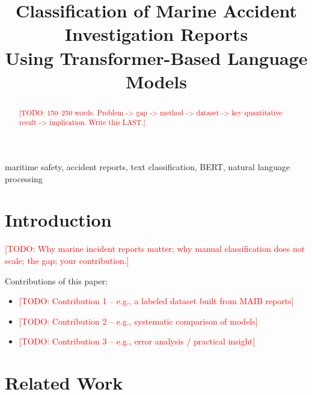 \documentclass[conference]{IEEEtran}
\newcommand{\todo}[1]{\textcolor{red}{[TODO: #1]}}
\begin{document}
\title{Classification of Marine Accident Investigation Reports\\
Using Transformer-Based Language Models}

\author{
\and
{}
}

\maketitle

\begin{abstract}
\todo{150--250 words. Problem -> gap -> method -> dataset -> key quantitative result -> implication. Write this LAST.}
\end{abstract}

\begin{IEEEkeywords}
maritime safety, accident reports, text classification, BERT, natural language processing
\end{IEEEkeywords}

\section{Introduction}
\todo{Why marine incident reports matter; why manual classification does not scale; the gap; your contribution.}

Contributions of this paper:
\begin{itemize}
  \item \todo{Contribution 1 -- e.g., a labeled dataset built from MAIB reports}
  \item \todo{Contribution 2 -- e.g., systematic comparison of models}
  \item \todo{Contribution 3 -- e.g., error analysis / practical insight}
\end{itemize}

\section{Related Work}
\end{document}
